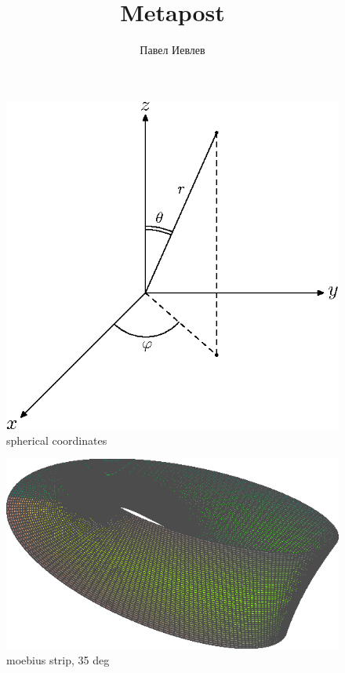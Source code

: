 \documentclass[a5paper]{article}
\author{Павел Иевлев}
\title{Metapost}
\date{}
\begin{document}
\maketitle

\begin{figure}[h]
  \centering
  \includegraphics{spherical_coordinates.eps}
  \caption{spherical coordinates}
  \label{fig:spherical_coordinates}
\end{figure}

\begin{figure}[h]
  \centering
  \includegraphics{moebius-35deg.eps}
  \caption{moebius strip, 35 deg}
  \label{fig:moebius-35deg}
\end{figure}
\end{document}
